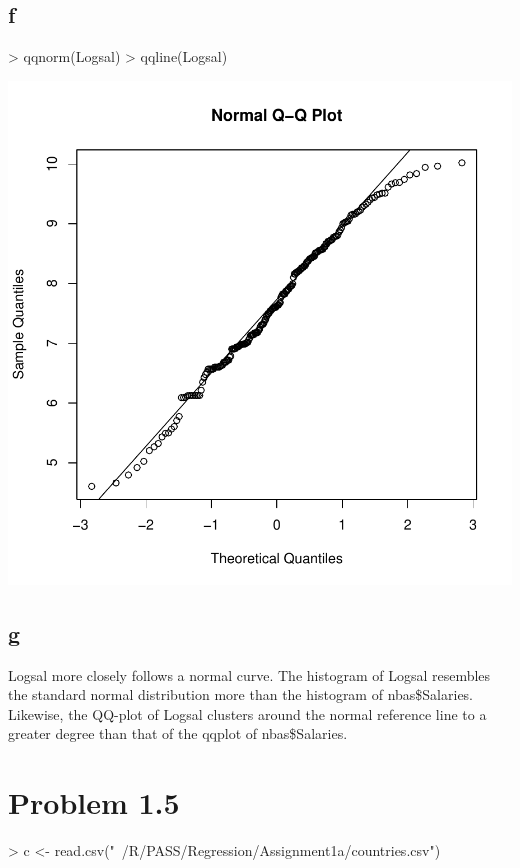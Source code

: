 \documentclass{article}
\begin{document}
\subsection*{f}
\begin{Schunk}
\begin{Sinput}
> qqnorm(Logsal)
> qqline(Logsal)
\end{Sinput}
\end{Schunk}
\includegraphics{Assignment1A-005}

\subsection*{g}
Logsal more closely follows a normal curve. The histogram of Logsal resembles the standard normal distribution more than the histogram of nbas\$Salaries. Likewise, the QQ-plot of Logsal clusters around the normal reference line to a greater degree than that of the qqplot of nbas\$Salaries. 

\section*{Problem 1.5}
\begin{Schunk}
\begin{Sinput}
>   c <- read.csv("~/R/PASS/Regression/Assignment1a/countries.csv")
\end{Sinput}
\end{Schunk}
\end{document}
